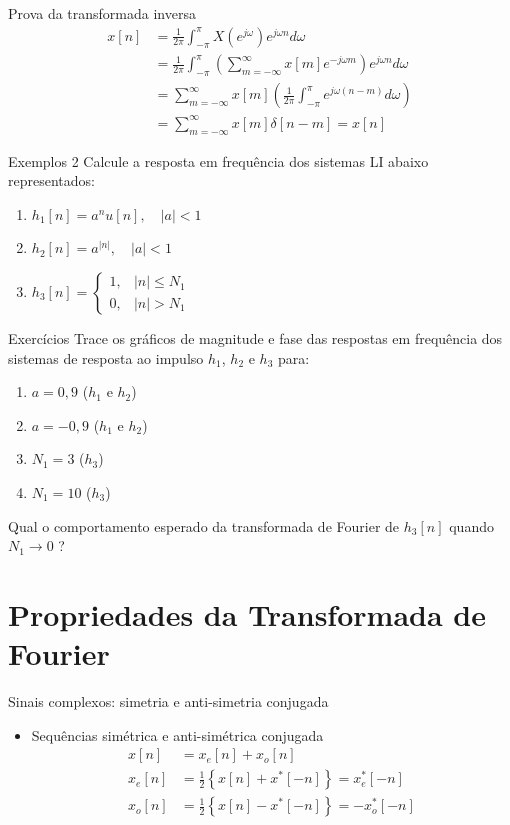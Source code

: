 \begin{slide}[toc=]{Prova da transformada inversa}
      \begin{align*} x[n]&= \frac{1}{2\pi}\int_{-\pi}^{\pi} X(e^{j\omega})e^{j\omega n} d\omega\\
                       &= \frac{1}{2\pi}\int_{-\pi}^{\pi} \left ( \sum_{m=-\infty}^{\infty} x[m]e^{-j\omega m}\right )e^{j\omega n} d\omega\\
                       & = \sum_{m=-\infty}^{\infty}x[m]\left ( \frac{1}{2\pi} \int_{-\pi}^{\pi} e^{j\omega(n-m)}d\omega \right ) \\   
                       & = \sum_{m=-\infty}^{\infty}x[m] \delta[n-m] = x[n]\end{align*}
\end{slide}

\begin{slide}[toc=]{Exemplos 2}
Calcule a resposta em frequência dos sistemas LI abaixo representados:
\begin{enumerate}
   \item $h_1[n] = a^nu[n], \quad |a|<1$
   \item $h_2[n] = a^{|n|}, \quad |a|<1$
   \item $h_3[n] = \begin{cases} 1,& |n|\leq N_1\\0,&|n|> N_1\end{cases}$
\end{enumerate}
\end{slide}

\begin{note}[toc=]{Exercícios}
Trace os gráficos de magnitude e fase das respostas em frequência dos sistemas de resposta ao impulso $h_1$, $h_2$ e $h_3$ para: 
\begin{enumerate}
   \item $a = 0,9$ ($h_1$ e $h_2$)
   \item $a = -0,9$ ($h_1$ e $h_2$)
   \item $N_1 = 3$ ($h_3$)
   \item $N_1 = 10$  ($h_3$)
\end{enumerate}
Qual o comportamento esperado da transformada de Fourier de $h_3[n]$ quando $N_1\rightarrow 0$ ?
\end{note}

\section[slide=true]{Propriedades da Transformada de Fourier}
\begin{slide}[toc=]{Sinais complexos: simetria e anti-simetria conjugada}
\begin{itemize}
   \item Sequências  simétrica e anti-simétrica conjugada
   \begin{align*}
      x[n] &= x_e[n]+x_o[n]\\
      x_e[n] &= \frac{1}{2} \left \{ x[n] + x^*[-n] \right \} = x_e^*[-n]\\
      x_o[n] &= \frac{1}{2} \left \{ x[n] - x^*[-n] \right \} = -x_o^*[-n]
   \end{align*} 
\end{itemize}
\end{slide}

